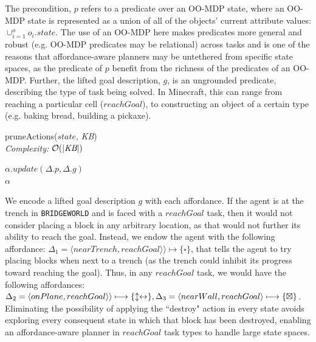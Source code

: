 \documentclass[]{article}
\newcommand{\stnote}[1]{\textcolor{Blue}{\textbf{ST: #1}}}
\newcommand{\jmnote}[1]{\textcolor{Green}{\textbf{JM: #1}}}
\newcommand{\dgnote}[1]{\textcolor{Orange}{\textbf{DG: #1}}}
\begin{document}
The precondition, $p$ refers to a predicate over an OO-MDP state, where an OO-MDP state is represented
as a union of all of the objects' current attribute values:
$\cup_{i = 1}^o o_i.state$.  The use of an OO-MDP here makes
predicates more general and robust (e.g. OO-MDP predicates may be relational) 
across tasks and is one of the reasons that affordance-aware 
planners may be untethered from specific state spaces, as the predicate of
$p$  benefit from the richness of the predicates of an OO-MDP. Further, the 
lifted goal description, $g$, is an ungrounded predicate, describing the type of task being solved. In Minecraft,
this can range from reaching a particular cell ($reachGoal$), to constructing
an object of a certain type (e.g. baking bread, building a pickaxe).


\begin{algorithm}
  \caption{pruneActions($state$, {\it KB}) \\ {\it Complexity:} $\mathcal{O}(|\text{{\it KB}}|)$}
  \begin{algorithmic}[1]
    \State $\alpha.update(\Delta.p, \Delta.g)$
    \EndIf
    \EndFor \\
    \Return $\alpha$
  \end{algorithmic}
  \label{alg:prune_actions}
\end{algorithm}


We encode a lifted goal description $g$ with each affordance. 
If the agent is at the trench in \texttt{BRIDGEWORLD}
and is faced with a $reachGoal$ task, then it would not consider placing a block
in any arbitrary location, as that would not further its ability to reach the goal. Instead, we endow
the agent with the following affordance: $\Delta_1 = \langle nearTrench, reachGoal \rangle \rangle \longmapsto \{\square\}$,
that tells the agent to try placing blocks when next to a trench
(as the trench could inhibit its progress toward reaching the goal). Thus, in any $reachGoal$
task, we would have the following affordances: $\Delta_2 = \langle onPlane, reachGoal \rangle \rangle \longmapsto \{\updownarrow \leftrightarrow\}, \\ \Delta_3 = \langle nearWall, reachGoal \rangle \longmapsto \{\boxtimes \}$.
Eliminating the possibility of applying the ``destroy" action in every state 
avoids exploring every consequent state in which that block has
been destroyed, enabling an affordance-aware planner in $reachGoal$ task
types to handle large state spaces.
\end{document}

